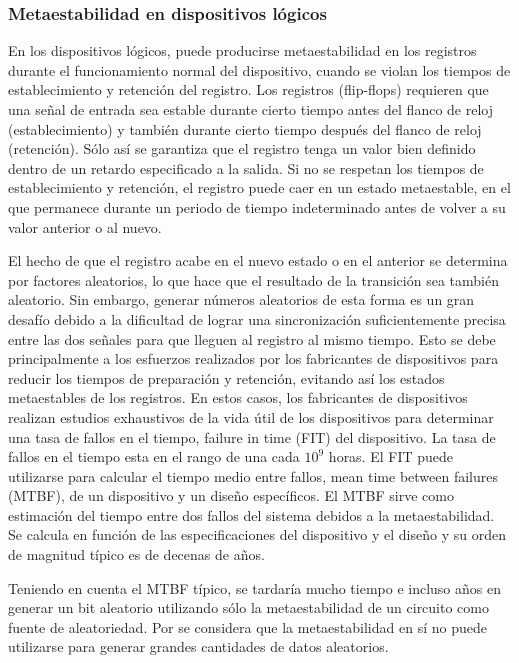             \subsubsection{Metaestabilidad en dispositivos lógicos}
                En los dispositivos lógicos, puede producirse metaestabilidad en los registros durante el funcionamiento normal del dispositivo, cuando se violan los tiempos de establecimiento y retención del registro. Los registros (flip-flops) requieren que una señal de entrada sea estable durante cierto tiempo antes del flanco de reloj (establecimiento) y también durante cierto tiempo después del flanco de reloj (retención). Sólo así se garantiza que el registro tenga un valor bien definido dentro de un retardo especificado a la salida. Si no se respetan los tiempos de establecimiento y retención, el registro puede caer en un estado metaestable, en el que permanece durante un periodo de tiempo indeterminado antes de volver a su valor anterior o al nuevo.

                El hecho de que el registro acabe en el nuevo estado o en el anterior se determina por factores aleatorios, lo que hace que el resultado de la transición sea también aleatorio. Sin embargo, generar números aleatorios de esta forma es un gran desafío debido a la dificultad de lograr una sincronización suficientemente precisa entre las dos señales para que lleguen al registro al mismo tiempo. Esto se debe principalmente a los esfuerzos realizados por los fabricantes de dispositivos para reducir los tiempos de preparación y retención, evitando así los estados metaestables de los registros. En estos casos, los fabricantes de dispositivos realizan estudios exhaustivos de la vida útil de los dispositivos para determinar una tasa de fallos en el tiempo, failure in time (FIT) del dispositivo. La tasa de fallos en el tiempo esta en el rango de una cada $10^{9}$ horas. El FIT puede utilizarse para calcular el tiempo medio entre fallos, mean time between failures (MTBF), de un dispositivo y un diseño específicos. El MTBF sirve como estimación del tiempo entre dos fallos del sistema debidos a la metaestabilidad. Se calcula en función de las especificaciones del dispositivo y el diseño y su orden de magnitud típico es de decenas de años.

                Teniendo en cuenta el MTBF típico, se tardaría mucho tiempo e incluso años en generar un bit aleatorio utilizando sólo la metaestabilidad de un circuito como fuente de aleatoriedad. Por se considera que la metaestabilidad en sí no puede utilizarse para generar grandes cantidades de datos aleatorios.

